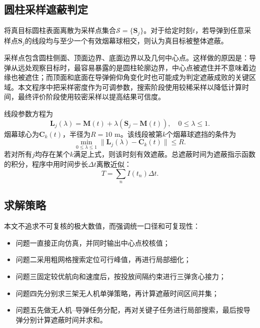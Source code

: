 \documentclass[12pt,a4paper]{article}
\begin{document}
\subsection{圆柱采样遮蔽判定}

将真目标圆柱表面离散为采样点集合$\mathcal S=\{\boldsymbol S_j\}$。对于给定时刻$t$，若导弹到任意采样点$\boldsymbol S_j$的线段均与至少一个有效烟幕球相交，则认为真目标被整体遮蔽。

采样点包含圆柱侧面、顶面边界、底面边界以及几何中心点。这样做的原因是：导弹从远处观察目标时，最容易暴露的是圆柱轮廓边界，中心点被遮住并不意味着边缘也被遮住；而顶面和底面在导弹俯仰角变化时也可能成为判定遮蔽成败的关键区域。本文程序中把采样密度作为可调参数，搜索阶段使用较稀采样以降低计算时间，最终评价阶段使用较密采样以提高结果可信度。

线段参数方程为
\begin{equation}
\boldsymbol L_j(\lambda)=\boldsymbol M(t)+\lambda(\boldsymbol S_j-\boldsymbol M(t)),\quad 0\leq \lambda\leq 1.
\end{equation}
烟幕球心为$\boldsymbol C_k(t)$，半径为$R=10$ m。该线段被第$k$个烟幕球遮挡的条件为
\begin{equation}
\min_{0\leq \lambda\leq 1}\|\boldsymbol L_j(\lambda)-\boldsymbol C_k(t)\|\leq R.
\end{equation}
若对所有$j$均存在某个$k$满足上式，则该时刻有效遮蔽。总遮蔽时间为遮蔽指示函数的积分，程序中用时间步长$\Delta t$离散近似：
\begin{equation}
T=\sum_n I(t_n)\Delta t.
\end{equation}

\subsection{求解策略}

本文不追求不可复核的极大数值，而强调统一口径和可复现性：
\begin{itemize}
\item 问题一直接正向仿真，并同时输出中心点校核值；
\item 问题二采用粗网格搜索定位可行峰值，再进行局部细化；
\item 问题三固定较优航向和速度后，按投放间隔约束进行三弹贪心接力；
\item 问题四先分别求三架无人机单弹策略，再计算遮蔽时间区间并集；
\item 问题五先做无人机--导弹任务分配，再对关键子任务进行局部搜索，最后按导弹分别计算遮蔽时间并求和。
\end{itemize}
\end{document}
